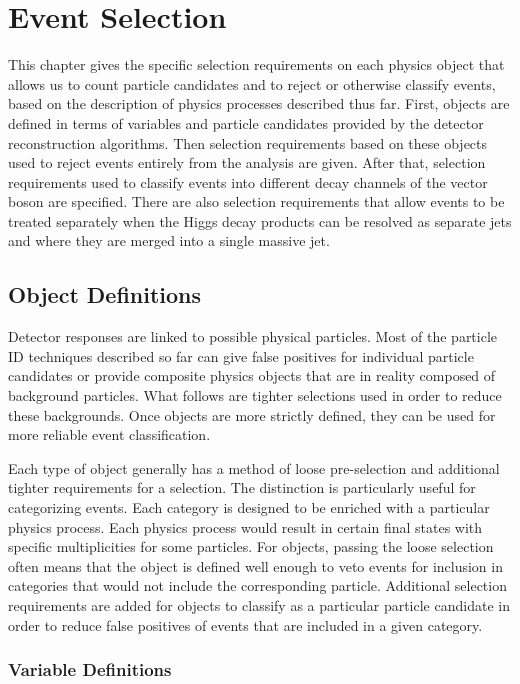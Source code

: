 \chapter{Event Selection} \label{ch:selection}

This chapter gives the specific selection requirements on each physics object
that allows us to count particle candidates and to reject or otherwise classify events,
based on the description of physics processes described thus far.
First, objects are defined in terms of variables and particle candidates provided by the
detector reconstruction algorithms.
Then selection requirements based on these objects used to reject events entirely
from the analysis are given.
After that, selection requirements used to classify events
into different decay channels of the vector boson are specified.
There are also selection requirements that allow events to be treated separately
when the Higgs decay products can be resolved as separate jets
and where they are merged into a single massive jet.

\section{Object Definitions}

Detector responses are linked to possible physical particles.
Most of the particle ID techniques described so far can give
false positives for individual particle candidates
or provide composite physics objects that are in reality composed of background particles.
What follows are tighter selections used in order to reduce these backgrounds.
Once objects are more strictly defined,
they can be used for more reliable event classification.

Each type of object generally has a method of loose pre-selection
and additional tighter requirements for a selection.
The distinction is particularly useful for categorizing events.
Each category is designed to be enriched with a particular physics process.
Each physics process would result in certain final states
with specific multiplicities for some particles.
For objects, passing the loose selection often means that the object is defined
well enough to veto events for inclusion in categories that
would not include the corresponding particle.
Additional selection requirements are added for objects to classify
as a particular particle candidate in order to reduce false positives
of events that are included in a given category.

\subsection{Variable Definitions}

